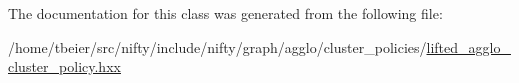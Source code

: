 The documentation for this class was generated from the following file\+:\begin{DoxyCompactItemize}
\item 
/home/tbeier/src/nifty/include/nifty/graph/agglo/cluster\+\_\+policies/\hyperlink{lifted__agglo__cluster__policy_8hxx}{lifted\+\_\+agglo\+\_\+cluster\+\_\+policy.\+hxx}\end{DoxyCompactItemize}
